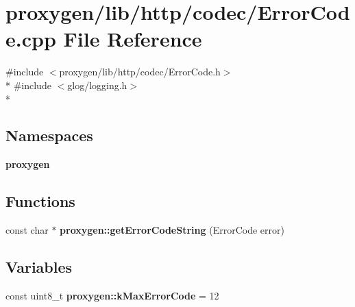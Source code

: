 \section{proxygen/lib/http/codec/\+Error\+Code.cpp File Reference}
\label{ErrorCode_8cpp}
{\ttfamily \#include $<$proxygen/lib/http/codec/\+Error\+Code.\+h$>$}\\*
{\ttfamily \#include $<$glog/logging.\+h$>$}\\*
\subsection*{Namespaces}
\begin{DoxyCompactItemize}
\item 
 {\bf proxygen}
\end{DoxyCompactItemize}
\subsection*{Functions}
\begin{DoxyCompactItemize}
\item 
const char $\ast$ {\bf proxygen\+::get\+Error\+Code\+String} (Error\+Code error)
\end{DoxyCompactItemize}
\subsection*{Variables}
\begin{DoxyCompactItemize}
\item 
const uint8\+\_\+t {\bf proxygen\+::k\+Max\+Error\+Code} = 12
\end{DoxyCompactItemize}
